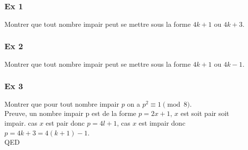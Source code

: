 \documentclass[]{book}
\theoremstyle{definition}
\begin{document}
\subsubsection{Ex 1}
Montrer que tout nombre impair peut se mettre sous la forme $4k+1$ ou $4k+3$.\\
\subsubsection{Ex 2}
Montrer que tout nombre impair peut se mettre sous la forme $4k+1$ ou $4k-1$.\\
\subsubsection{Ex 3}
Montrer que pour tout nombre impair $p$ on a $p^2 \equiv 1 \pmod{8}$.\\

Preuve, un nombre impair p est de la forme $p = 2x+1$, $x$ est soit pair soit impair. cas $x$ est pair donc $p = 4l +1$, cas $x$ est impair donc $p=4k+3 = 4(k+1) -1$.\\


QED
\end{document}
